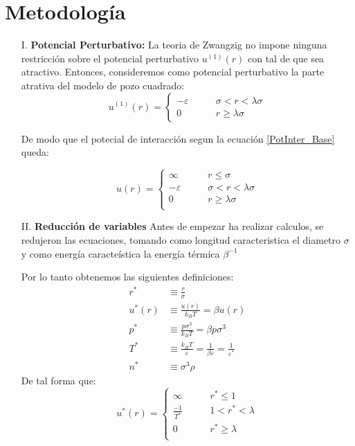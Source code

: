 \documentclass[12pt,letterpaper]{article}
\begin{document}
\section{Metodología}
\begin{enumerate}
\item[I.]\textbf{Potencial Perturbativo:} La teoria de Zwangzig no impone ninguna restricción sobre el potencial perturbativo $u^{(1)}(r)$ con tal de que sea atractivo. Entonces, consideremos  como potencial  perturbativo la parte atrativa del modelo de pozo cuadrado:
\begin{equation}
	u^{(1)}(r) =
	\left\{
	\begin{aligned}
        -\varepsilon &  \qquad \sigma < r < \lambda\sigma\\
		0 & \qquad r \geq \lambda\sigma 
    \end{aligned}
    \right.
	\label{Pozo}
\end{equation}

De modo que el potecial de interacción segun la ecuación \eqref{PotInter_Base} queda:

\begin{equation}
	u(r)=
	\left\{
	\begin{aligned}
		\infty & \qquad r \leq \sigma \\
        -\varepsilon &  \qquad \sigma < r < \lambda\sigma\\
		0 & \qquad r \geq \lambda\sigma \\
	\end{aligned}
    \right.
	\label{PotInteracTotal}
\end{equation}

\item[II.] \textbf{Reducción de variables} Antes de empezar ha realizar calculos, se redujeron las ecuaciones, tomando como longitud caracteristica el diametro $\sigma$ y como energía caracteística la energía térmica $\beta^{-1}$

Por lo tanto obtenemos las siguientes definiciones:
\begin{align}
	r^* &\equiv \frac{r}{\sigma} \label{rRed} \\
	u^*(r) &\equiv \frac{u(r)}{k_B T} = \beta u(r) \label{potRed}\\
	p^* &\equiv \frac{p\sigma^3}{k_B T} =\beta p\sigma^3 \label{presRed}\\
	T^* &\equiv \frac{k_B T}{\varepsilon} =\frac{1}{\beta \varepsilon} = \frac{1}{\varepsilon^*} \label{TempRed} \\
	n^* &\equiv \sigma^3\rho \label{ConsRed}
\end{align}
 De tal forma que:
\begin{equation}
	u^*(r)=
	\left\{
	\begin{aligned}
		\infty & \qquad r^* \leq 1 \\
        \frac{-1}{T^*} &  \qquad 1 < r^* < \lambda\\
		0 & \qquad r^* \geq \lambda \\
	\end{aligned}
    \right.
	\label{PotInteracTotal_Red}
\end{equation}



\end{enumerate}
\end{document}
